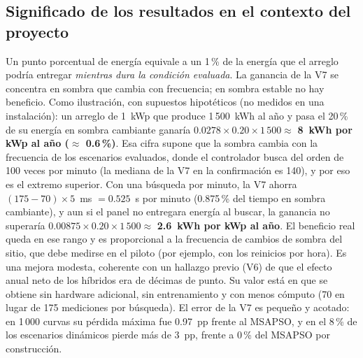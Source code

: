 \documentclass[letterpaper,11pt]{article}
\begin{document}
\subsection{Significado de los resultados en el contexto del proyecto}
Un punto porcentual de energía equivale a un 1\,\% de la energía que el arreglo podría entregar \textit{mientras dura la condición evaluada}. La ganancia de la V7 se concentra en sombra que cambia con frecuencia; en sombra estable no hay beneficio. Como ilustración, con supuestos hipotéticos (no medidos en una instalación): un arreglo de 1~kWp que produce 1\,500~kWh al año y pasa el 20\,\% de su energía en sombra cambiante ganaría $0.0278 \times 0.20 \times 1\,500 \approx$ \textbf{8~kWh por kWp al año ($\approx$ 0.6\,\%)}. Esa cifra supone que la sombra cambia con la frecuencia de los escenarios evaluados, donde el controlador busca del orden de 100 veces por minuto (la mediana de la V7 en la confirmación es 140), y por eso es el extremo superior. Con una búsqueda por minuto, la V7 ahorra $(175-70) \times 5$~ms $= 0.525$~s por minuto (0.875\,\% del tiempo en sombra cambiante), y aun si el panel no entregara energía al buscar, la ganancia no superaría $0.00875 \times 0.20 \times 1\,500 \approx$ \textbf{2.6~kWh por kWp al año}. El beneficio real queda en ese rango y es proporcional a la frecuencia de cambios de sombra del sitio, que debe medirse en el piloto (por ejemplo, con los reinicios por hora). Es una mejora modesta, coherente con un hallazgo previo (V6) de que el efecto anual neto de los híbridos era de décimas de punto. Su valor está en que se obtiene sin hardware adicional, sin entrenamiento y con menos cómputo (70 en lugar de 175 mediciones por búsqueda). El error de la V7 es pequeño y acotado: en 1\,000 curvas su pérdida máxima fue 0.97~pp frente al MSAPSO, y en el 8\,\% de los escenarios dinámicos pierde más de 3~pp, frente a 0\,\% del MSAPSO por construcción.
\end{document}
